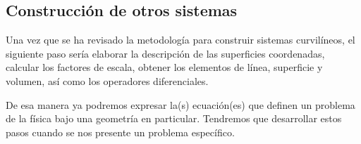 \documentclass[12pt]{article}
\numberwithin{equation}{section}
\begin{document}
\subsection{Construcción de otros sistemas}

Una vez que se ha revisado la metodología para construir sistemas curvilíneos, el siguiente paso sería elaborar la descripción de las superficies coordenadas, calcular los factores de escala, obtener los elementos de línea, superficie y volumen, así como los operadores diferenciales.
\par
De esa manera ya podremos expresar la(s) ecuación(es) que definen un problema de la física bajo una geometría en particular. Tendremos que desarrollar estos pasos cuando se nos presente un problema específico.

\end{document}
